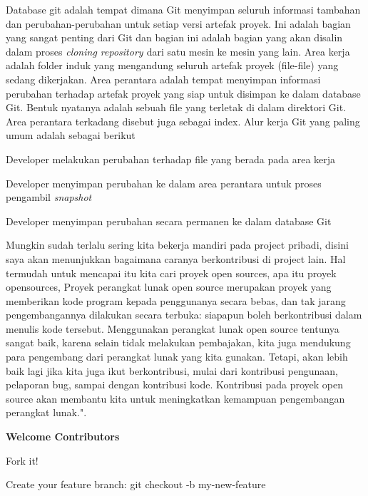 \noindent 
Database git adalah tempat dimana Git menyimpan seluruh informasi tambahan dan perubahan-perubahan untuk setiap versi artefak proyek. Ini adalah bagian yang sangat penting dari Git dan bagian ini adalah bagian yang akan disalin dalam proses \textit{cloning repository $  $}dari satu mesin ke mesin yang lain. Area kerja adalah folder induk yang mengandung seluruh artefak proyek (file-file) yang sedang dikerjakan. Area perantara adalah tempat menyimpan informasi perubahan terhadap artefak proyek yang siap untuk disimpan ke dalam database Git. Bentuk nyatanya adalah sebuah file yang terletak di dalam direktori Git. Area perantara terkadang disebut juga sebagai index.\vspace{\baselineskip}
Alur kerja Git yang paling umum adalah sebagai berikut \par
Developer melakukan perubahan terhadap file yang berada pada area kerja \par
Developer menyimpan perubahan ke dalam area perantara untuk proses pengambil \textit{snapshot} \par
Developer menyimpan perubahan secara permanen ke dalam database Git \par
\vspace{12pt}
\vspace{12pt}
\noindent 
Mungkin sudah terlalu sering kita bekerja mandiri pada project pribadi, disini saya akan menunjukkan bagaimana caranya berkontribusi di project lain. Hal termudah untuk mencapai itu kita cari proyek open sources, apa itu proyek opensources, Proyek perangkat lunak open source merupakan proyek yang memberikan kode program kepada penggunanya secara bebas, dan tak jarang pengembangannya dilakukan secara terbuka: siapapun boleh berkontribusi dalam menulis kode tersebut. Menggunakan perangkat lunak open source tentunya sangat baik, karena selain tidak melakukan pembajakan, kita juga mendukung para pengembang dari perangkat lunak yang kita gunakan. Tetapi, akan lebih baik lagi jika kita juga ikut berkontribusi, mulai dari kontribusi pengunaan, pelaporan bug, sampai dengan kontribusi kode. Kontribusi pada proyek open source akan membantu kita untuk meningkatkan kemampuan pengembangan perangkat lunak.". \par
\vspace{12pt}
\vspace{12pt}
\noindent 
\textbf{Welcome Contributors} \par
Fork it! \par
Create your feature branch: git checkout -b my-new-feature \par
